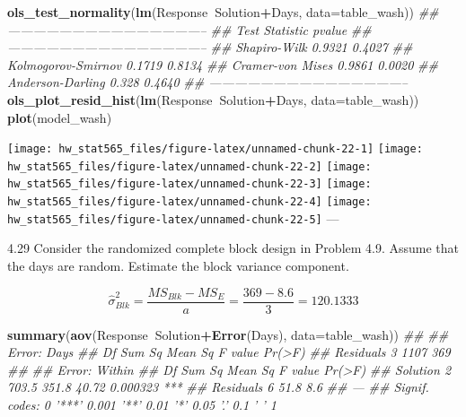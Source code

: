 \documentclass[]{article}
\newenvironment{Shaded}{\begin{snugshade}}{\end{snugshade}}
\newcommand{\CommentTok}[1]{\textcolor[rgb]{0.56,0.35,0.01}{\textit{#1}}}
\newcommand{\DataTypeTok}[1]{\textcolor[rgb]{0.13,0.29,0.53}{#1}}
\newcommand{\KeywordTok}[1]{\textcolor[rgb]{0.13,0.29,0.53}{\textbf{#1}}}
\newcommand{\NormalTok}[1]{#1}
\newcommand{\OperatorTok}[1]{\textcolor[rgb]{0.81,0.36,0.00}{\textbf{#1}}}
\begin{document}
\begin{Shaded}
\begin{Highlighting}[]
\KeywordTok{ols_test_normality}\NormalTok{(}\KeywordTok{lm}\NormalTok{(Response}\OperatorTok{~}\NormalTok{Solution}\OperatorTok{+}\NormalTok{Days, }\DataTypeTok{data=}\NormalTok{table_wash))}
\CommentTok{## -----------------------------------------------}
\CommentTok{##        Test             Statistic       pvalue  }
\CommentTok{## -----------------------------------------------}
\CommentTok{## Shapiro-Wilk              0.9321         0.4027 }
\CommentTok{## Kolmogorov-Smirnov        0.1719         0.8134 }
\CommentTok{## Cramer-von Mises          0.9861         0.0020 }
\CommentTok{## Anderson-Darling          0.328          0.4640 }
\CommentTok{## -----------------------------------------------}
\KeywordTok{ols_plot_resid_hist}\NormalTok{(}\KeywordTok{lm}\NormalTok{(Response}\OperatorTok{~}\NormalTok{Solution}\OperatorTok{+}\NormalTok{Days, }\DataTypeTok{data=}\NormalTok{table_wash))}
\KeywordTok{plot}\NormalTok{(model_wash)}
\end{Highlighting}
\end{Shaded}

\texttt{[image: hw\_stat565\_files/figure-latex/unnamed-chunk-22-1]}
\texttt{[image: hw\_stat565\_files/figure-latex/unnamed-chunk-22-2]}
\texttt{[image: hw\_stat565\_files/figure-latex/unnamed-chunk-22-3]}
\texttt{[image: hw\_stat565\_files/figure-latex/unnamed-chunk-22-4]}
\texttt{[image: hw\_stat565\_files/figure-latex/unnamed-chunk-22-5]}
---

4.29 Consider the randomized complete block design in Problem 4.9.
Assume that the days are random. Estimate the block variance component.

\[\hat\sigma_{Blk}^2=\frac{MS_{Blk}-MS_{E}}{a}=\frac{369-8.6}{3}=120.1333\]

\begin{Shaded}
\begin{Highlighting}[]
\KeywordTok{summary}\NormalTok{(}\KeywordTok{aov}\NormalTok{(Response}\OperatorTok{~}\NormalTok{Solution}\OperatorTok{+}\KeywordTok{Error}\NormalTok{(Days), }\DataTypeTok{data=}\NormalTok{table_wash))}
\CommentTok{## }
\CommentTok{## Error: Days}
\CommentTok{##           Df Sum Sq Mean Sq F value Pr(>F)}
\CommentTok{## Residuals  3   1107     369               }
\CommentTok{## }
\CommentTok{## Error: Within}
\CommentTok{##           Df Sum Sq Mean Sq F value   Pr(>F)    }
\CommentTok{## Solution   2  703.5   351.8   40.72 0.000323 ***}
\CommentTok{## Residuals  6   51.8     8.6                     }
\CommentTok{## ---}
\CommentTok{## Signif. codes:  0 '***' 0.001 '**' 0.01 '*' 0.05 '.' 0.1 ' ' 1}
\end{Highlighting}
\end{Shaded}
\end{document}
